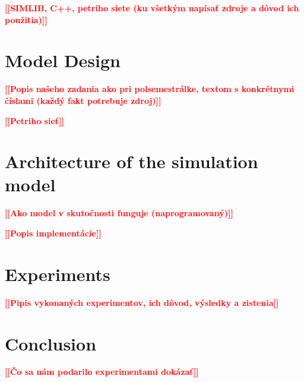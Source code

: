 \documentclass[a4paper, 11pt, a4paper]{article}
\newcommand{\todo}[1]{\textcolor{red}{\textbf{[[#1]]}}}
\begin{document}
\noindent\todo{SIMLIB, C++, petriho siete (ku všetkým napísať zdroje a dôvod ich použitia)}



\section{Model Design}

\noindent\todo{Popis našeho zadania ako pri polsemestrálke, textom s konkrétnymi číslami (každý fakt potrebuje zdroj)}

\noindent\todo{Petriho sieť}


\section{Architecture of the simulation model}

\noindent\todo{Ako model v skutočnosti funguje (naprogramovaný)}

\noindent\todo{Popis implementácie}


\section{Experiments}

\todo{Pipis vykonaných experimentov, ich dôvod, výsledky a zistenia}


\section{Conclusion}

\todo{Čo sa nám podarilo experimentami dokázať}


\newpage


\renewcommand{\refname}{Sources}

\end{document}
